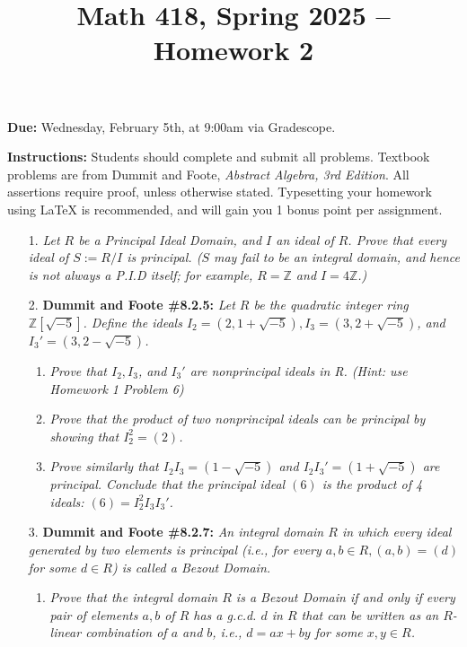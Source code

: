\documentclass[12pt]{article}
\title{Math 418, Spring 2025 -- Homework 2}
\date{}
\newcommand{\Z}{\mathbb{Z}}
\begin{document}
 \maketitle
\vspace{-80pt}

\textbf{Due:} Wednesday, February 5th, at 9:00am via Gradescope.

\textbf{Instructions:} Students should complete and submit all problems. Textbook problems are from Dummit and Foote, \emph{Abstract Algebra, 3rd Edition}. All assertions require proof, unless otherwise stated. Typesetting your homework using LaTeX is recommended, and will gain you 1 bonus point per assignment.

\begin{enumerate}

\item[1.] \textit{Let $R$ be a Principal Ideal Domain, and $I$ an ideal of $R$. Prove that every ideal of $S := R/I$
is principal. ($S$ may fail to be an integral domain, and hence is not always a P.I.D itself; for example, $R = \Z$ and $I = 4\Z$.)}

\item[2.] \textbf{Dummit and Foote \#8.2.5:} \textit{Let $R$ be the quadratic integer ring $\Z[\sqrt{-5}]$. Define the ideals $I_2 = (2, 1 + \sqrt{-5}), I_3 = (3, 2 + \sqrt{-5})$, and $I_3' = (3, 2 - \sqrt{-5})$.}

\begin{enumerate}
    \item \textit{Prove that $I_2, I_3$, and $I_3'$ are nonprincipal ideals in R. (Hint: use Homework 1 Problem 6)}

    \item \textit{Prove that the product of two nonprincipal ideals can be principal by showing that $I_2^2 = (2)$.}

    \item \textit{Prove similarly that $I_2I_3 = (1-\sqrt{-5})$ and $I_2I_3' = (1+\sqrt{-5})$ are principal. Conclude that the principal ideal $(6)$ is the product of 4 ideals: $(6) = I_2^2I_3I_3'$.}
\end{enumerate}

\item[3.] \textbf{Dummit and Foote \#8.2.7:} \textit{An integral domain $R$ in which every ideal generated by two elements is principal (i.e., for every $a, b\in R, (a, b) = (d)$ for some $d\in R$) is called a Bezout Domain.}

\begin{enumerate}
    \item \textit{Prove that the integral domain $R$ is a Bezout Domain if and only if every pair of elements $a, b$ of $R$ has a g.c.d. $d$ in $R$ that can be written as an $R$-linear combination of $a$ and $b$, i.e., $d = ax + by$ for some $x, y\in R$.}


\end{enumerate}
\end{enumerate}
\end{document}
